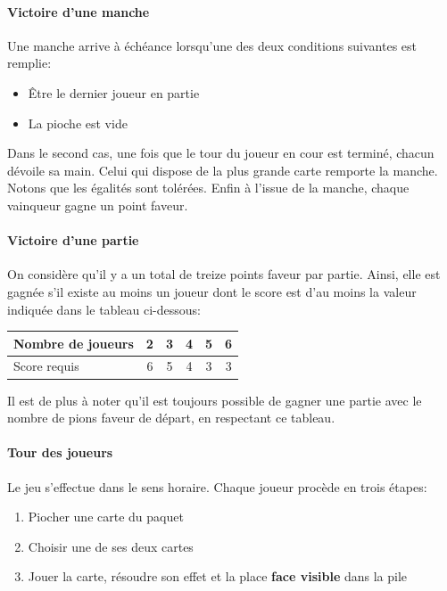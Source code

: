 \documentclass[paper=a4,fontsize=12pt,titlepage]{scrartcl}
\begin{document}
    \paragraph{Victoire d'une manche} Une manche arrive à échéance lorsqu'une des deux conditions suivantes est remplie:
    \begin{itemize}
        \item Être le dernier joueur en partie
        \item La pioche est vide
    \end{itemize}
    Dans le second cas, une fois que le tour du joueur en cour est terminé, chacun dévoile sa main. Celui qui dispose de
    la plus grande carte remporte la manche. Notons que les égalités sont tolérées.
    Enfin à l'issue de la manche, chaque vainqueur gagne un point faveur.

    \paragraph{Victoire d'une partie} On considère qu'il y a un total de treize points faveur par partie. Ainsi, elle est
    gagnée s'il existe au moins un joueur dont le score est d'au moins la valeur indiquée dans le tableau ci-dessous:
    \begin{center}
        \begin{tabular}{|l||c|c|c|c|c|}
            \hline
            Nombre de joueurs & 2 & 3 & 4 & 5 & 6\\
            \hline
            Score requis & 6 & 5 & 4 & 3 & 3\\
            \hline
        \end{tabular}
    \end{center}
    Il est de plus à noter qu'il est toujours possible de gagner une partie avec le nombre de pions faveur de départ,
    en respectant ce tableau.

    \paragraph{Tour des joueurs} Le jeu s'effectue dans le sens horaire. Chaque joueur procède en trois étapes:
    \begin{enumerate}
        \item Piocher une carte du paquet
        \item Choisir une de ses deux cartes
        \item Jouer la carte, résoudre son effet et la place \textbf{face visible} dans la pile
    \end{enumerate}
\end{document}
